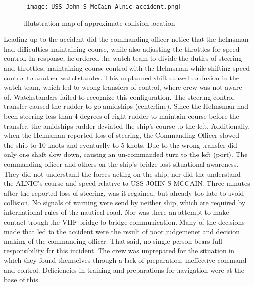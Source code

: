 \begin{wrapfigure}{L}{0.6\textwidth}
	\centering
	\texttt{[image: USS-John-S-McCain-Alnic-accident.png]}
	\caption{Illutstration map of approximate collision location}
	\label{fig:Accident-USS-John-S-McCain-Alnic}
\end{wrapfigure}

Leading up to the accident did the commanding officer notice that the helmsman had difficulties maintaining course, while also adjusting the throttles for speed control. In response, he ordered the watch team to divide the duties of steering and throttles, maintaining course control with the Helmsman while shifting speed control to another watchstander. This unplanned shift caused confusion in the watch team, which led to wrong transfers of control, where crew was not aware of. 
Watchstanders failed to recognize this configuration. The steering control transfer caused the rudder to go amidships (centerline). Since the Helmsman had been steering less than 4 degrees of right rudder to maintain course before the transfer, the amidships rudder deviated the ship’s course to the left. Additionally, when the Helmsman reported loss of steering, the Commanding Officer slowed the ship to 10 knots and eventually to 5 knots. Due to the wrong transfer did only one shaft slow down, causing an un-commanded turn to the left (port). The commanding officer and others on the ship's bridge lost situational awareness. They did not understand the forces acting on the ship, nor did the understand the ALNIC's course and speed relative to USS JOHN S MCCAIN. Three minutes after the reported loss of steering, was it regained, but already too late to avoid collision. No signals of warning were send by neither ship, which are required by international rules of the nautical road. Nor was there an attempt to make contact trough the \ac{VHF} bridge-to-bridge communication.
Many of the decisions made that led to the accident were the result of poor judgemenet and decision making of the commanding officer. That said, no single person bears full responsibility for this incident. The crew was unprepared for the situation in which they found themselves through a lack of preparation, ineffective command and control. Deficiencies in training and preparations for navigation were at the base of this. \cite{USSNavy2017}